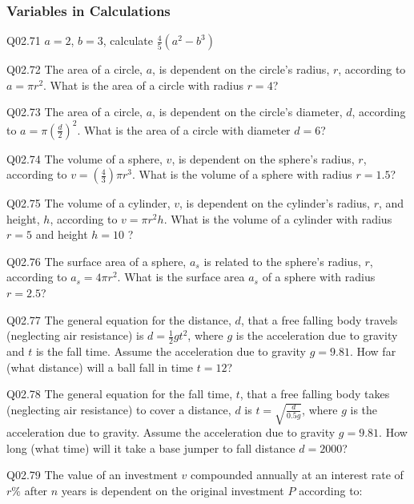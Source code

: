 \documentclass{book}
\newenvironment{problems}{}{}  %
\begin{document}
    




    
        \begin{problems}
        \subsubsection{Variables in
Calculations}\label{variables-in-calculations}

Q02.71 \(a = 2\), \(b = 3\), calculate \(\frac{4}{5}(a^2 - b^3)\)

Q02.72 The area of a circle, \(a\), is dependent on the circle's radius,
\(r\), according to \(a=\pi r^2\). What is the area of a circle with
radius \(r=4\)?

Q02.73 The area of a circle, \(a\), is dependent on the circle's
diameter, \(d\), according to \(a=\pi (\frac{d}{2})^2\). What is the
area of a circle with diameter \(d=6\)?

Q02.74 The volume of a sphere, \(v\), is dependent on the sphere's
radius, \(r\), according to \(v=(\frac{4}{3})\pi r^3\). What is the
volume of a sphere with radius \(r=1.5\)?

Q02.75 The volume of a cylinder, \(v\), is dependent on the cylinder's
radius, \(r\), and height, \(h\), according to \(v=\pi r^2 h\). What is
the volume of a cylinder with radius \(r=5\) and height \(h=10\) ?

Q02.76 The surface area of a sphere, \(a_s\) is related to the sphere's
radius, \(r\), according to \(a_s=4\pi r^2\). What is the surface area
\(a_s\) of a sphere with radius \(r=2.5\)?

Q02.77 The general equation for the distance, \(d\), that a free falling
body travels (neglecting air resistance) is \(d = \frac{1}{2}gt^2\),
where \(g\) is the acceleration due to gravity and \(t\) is the fall
time. Assume the acceleration due to gravity \(g = 9.81\). How far (what
distance) will a ball fall in time \(t = 12\)?

Q02.78 The general equation for the fall time, \(t\), that a free
falling body takes (neglecting air resistance) to cover a distance,
\(d\) is \(t = \sqrt{\frac{d}{0.5g}}\), where \(g\) is the acceleration
due to gravity. Assume the acceleration due to gravity \(g = 9.81\). How
long (what time) will it take a base jumper to fall distance
\(d = 2000\)?

Q02.79 The value of an investment \(v\) compounded annually at an
interest rate of \(r\%\) after \(n\) years is dependent on the original
investment \(P\) according to:


\end{problems}
\end{document}
